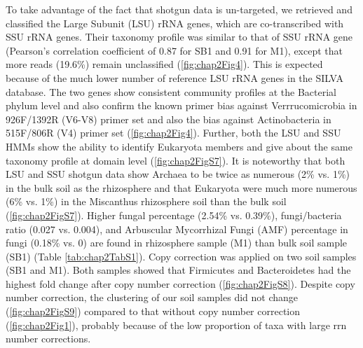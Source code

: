\documentclass[]{msu-thesis}
\begin{document}
To take advantage of the fact that shotgun data is un-targeted, we retrieved and classified the Large Subunit (LSU) rRNA genes, which are co-transcribed with SSU rRNA genes. Their taxonomy profile was similar to that of SSU rRNA gene (Pearson’s correlation coefficient of 0.87 for SB1 and 0.91 for M1), except that more reads (19.6\%) remain unclassified (\cref{fig:chap2Fig4}). This is expected because of the much lower number of reference LSU rRNA genes in the SILVA database. The two genes show consistent community profiles at the Bacterial phylum level and also confirm the known primer bias against Verrrucomicrobia in 926F/1392R (V6-V8) primer set and also the bias against Actinobacteria in 515F/806R (V4) primer set (\cref{fig:chap2Fig4}). Further, both the LSU and SSU HMMs show the ability to identify Eukaryota members and give about the same taxonomy profile at domain level (\cref{fig:chap2FigS7}). It is noteworthy that both LSU and SSU shotgun data show Archaea to be twice as numerous (2\% vs. 1\%) in the bulk soil as the rhizosphere and that Eukaryota were much more numerous (6\% vs. 1\%) in the Miscanthus rhizosphere soil than the bulk soil (\cref{fig:chap2FigS7}). Higher fungal percentage (2.54\% vs. 0.39\%), fungi/bacteria ratio (0.027 vs. 0.004), and Arbuscular Mycorrhizal Fungi (AMF) percentage in fungi (0.18\% vs. 0) are found in rhizosphere sample (M1) than bulk soil sample (SB1) (Table \ref{tab:chap2TabS1}). Copy correction was applied on two soil samples (SB1 and M1). Both samples showed that Firmicutes and Bacteroidetes had the highest fold change after copy number correction (\cref{fig:chap2FigS8}). Despite copy number correction, the clustering of our soil samples did not change (\cref{fig:chap2FigS9}) compared to that without copy number correction (\cref{fig:chap2Fig1}), probably because of the low proportion of taxa with large rrn number corrections.
\end{document}
